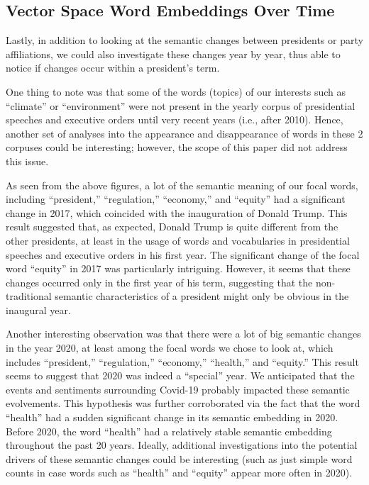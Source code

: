 \documentclass{article}
\begin{document}
{\subsection{Vector Space Word Embeddings Over Time}{
Lastly, in addition to looking at the semantic changes between presidents or party affiliations, we could also investigate these changes year by year, thus able to notice if changes occur within a president’s term. 
	
One thing to note was that some of the words (topics) of our interests such as “climate” or “environment” were not present in the yearly corpus of presidential speeches and executive orders until very recent years (i.e., after 2010). Hence, another set of analyses into the appearance and disappearance of words in these 2 corpuses could be interesting; however, the scope of this paper did not address this issue.

As seen from the above figures, a lot of the semantic meaning of our focal words, including “president,” “regulation,” “economy,” and “equity” had a significant change in 2017, which coincided with the inauguration of Donald Trump. This result suggested that, as expected, Donald Trump is quite different from the other presidents, at least in the usage of words and vocabularies in presidential speeches and executive orders in his first year. The significant change of the focal word “equity” in 2017 was particularly intriguing. However, it seems that these changes occurred only in the first year of his term, suggesting that the non-traditional semantic characteristics of a president might only be obvious in the inaugural year. 

Another interesting observation was that there were a lot of big semantic changes in the year 2020, at least among the focal words we chose to look at, which includes “president,” “regulation,” “economy,” “health,” and “equity.” This result seems to suggest that 2020 was indeed a “special” year. We anticipated that the events and sentiments surrounding Covid-19 probably impacted these semantic evolvements. This hypothesis was further corroborated via the fact that the word “health” had a sudden significant change in its semantic embedding in 2020. Before 2020, the word “health” had a relatively stable semantic embedding throughout the past 20 years. Ideally, additional investigations into the potential drivers of these semantic changes could be interesting (such as just simple word counts in case words such as “health” and “equity” appear more often in 2020).

}}
\end{document}
